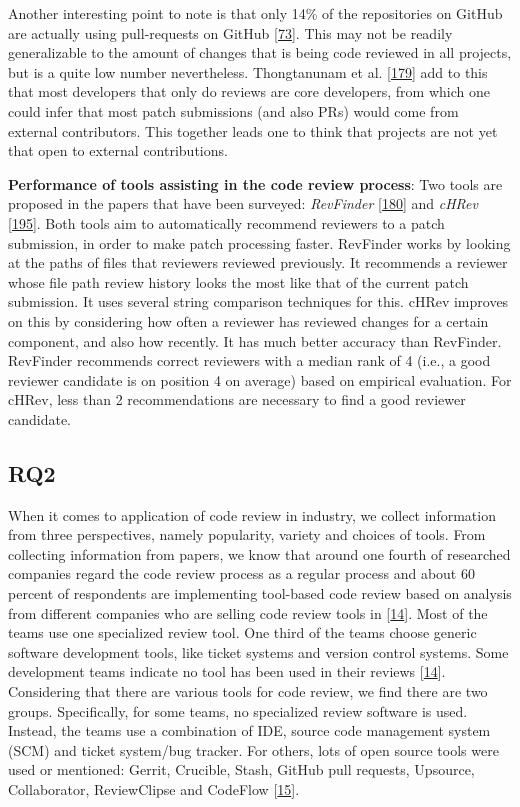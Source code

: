 \documentclass[]{book}
\begin{document}
Another interesting point to note is that only 14\% of the repositories
on GitHub are actually using pull-requests on GitHub
{[}\protect\hyperlink{ref-gousios2014exploratory}{73}{]}. This may not
be readily generalizable to the amount of changes that is being code
reviewed in all projects, but is a quite low number nevertheless.
Thongtanunam et al.
{[}\protect\hyperlink{ref-thongtanunam2016revisiting}{179}{]} add to
this that most developers that only do reviews are core developers, from
which one could infer that most patch submissions (and also PRs) would
come from external contributors. This together leads one to think that
projects are not yet that open to external contributions.

\textbf{Performance of tools assisting in the code review process}: Two
tools are proposed in the papers that have been surveyed:
\emph{RevFinder}
{[}\protect\hyperlink{ref-thongtanunam2015should}{180}{]} and
\emph{cHRev}
{[}\protect\hyperlink{ref-zanjani2016automatically}{195}{]}. Both tools
aim to automatically recommend reviewers to a patch submission, in order
to make patch processing faster. RevFinder works by looking at the paths
of files that reviewers reviewed previously. It recommends a reviewer
whose file path review history looks the most like that of the current
patch submission. It uses several string comparison techniques for this.
cHRev improves on this by considering how often a reviewer has reviewed
changes for a certain component, and also how recently. It has much
better accuracy than RevFinder. RevFinder recommends correct reviewers
with a median rank of 4 (i.e., a good reviewer candidate is on position
4 on average) based on empirical evaluation. For cHRev, less than 2
recommendations are necessary to find a good reviewer candidate.

\subsection{RQ2}\label{rq2}

When it comes to application of code review in industry, we collect
information from three perspectives, namely popularity, variety and
choices of tools. From collecting information from papers, we know that
around one fourth of researched companies regard the code review process
as a regular process and about 60 percent of respondents are
implementing tool-based code review based on analysis from different
companies who are selling code review tools in
{[}\protect\hyperlink{ref-baum2017choice}{14}{]}. Most of the teams use
one specialized review tool. One third of the teams choose generic
software development tools, like ticket systems and version control
systems. Some development teams indicate no tool has been used in their
reviews {[}\protect\hyperlink{ref-baum2017choice}{14}{]}. Considering
that there are various tools for code review, we find there are two
groups. Specifically, for some teams, no specialized review software is
used. Instead, the teams use a combination of IDE, source code
management system (SCM) and ticket system/bug tracker. For others, lots
of open source tools were used or mentioned: Gerrit, Crucible, Stash,
GitHub pull requests, Upsource, Collaborator, ReviewClipse and CodeFlow
{[}\protect\hyperlink{ref-baum2016faceted}{15}{]}.
\end{document}
